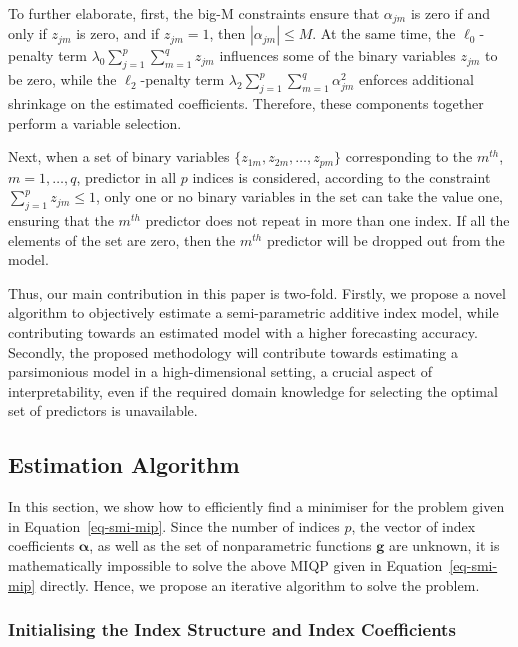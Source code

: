\documentclass[
  11pt,
  a4paper,
]{article}
\begin{document}
To further elaborate, first, the big-M constraints ensure that
\(\alpha_{jm}\) is zero if and only if \(z_{jm}\) is zero, and if
\(z_{jm} = 1\), then \(\left |\alpha_{jm}\right | \le M\). At the same
time, the \(\ell_{0}\)-penalty term
\(\lambda_{0}\sum_{j = 1}^{p}\sum_{m = 1}^{q}z_{jm}\) influences some of
the binary variables \(z_{jm}\) to be zero, while the
\(\ell_{2}\)-penalty term
\(\lambda_{2}\sum_{j = 1}^{p}\sum_{m = 1}^{q}\alpha_{jm}^{2}\) enforces
additional shrinkage on the estimated coefficients. Therefore, these
components together perform a variable selection.

Next, when a set of binary variables
\(\{z_{1m}, z_{2m}, \dots, z_{pm}\}\) corresponding to the \(m^{th}\),
\(m = 1, \dots, q\), predictor in all \(p\) indices is considered,
according to the constraint \(\sum_{j = 1}^{p}z_{jm} \le 1\), only one
or no binary variables in the set can take the value one, ensuring that
the \(m^{th}\) predictor does not repeat in more than one index. If all
the elements of the set are zero, then the \(m^{th}\) predictor will be
dropped out from the model.

Thus, our main contribution in this paper is two-fold. Firstly, we
propose a novel algorithm to objectively estimate a semi-parametric
additive index model, while contributing towards an estimated model with
a higher forecasting accuracy. Secondly, the proposed methodology will
contribute towards estimating a parsimonious model in a high-dimensional
setting, a crucial aspect of interpretability, even if the required
domain knowledge for selecting the optimal set of predictors is
unavailable.

\subsection{Estimation Algorithm}\label{estimation-algorithm}

In this section, we show how to efficiently find a minimiser for the
problem given in Equation~\ref{eq-smi-mip}. Since the number of indices
\(p\), the vector of index coefficients \(\bm{\alpha}\), as well as the
set of nonparametric functions \(\bm{g}\) are unknown, it is
mathematically impossible to solve the above MIQP given in
Equation~\ref{eq-smi-mip} directly. Hence, we propose an iterative
algorithm to solve the problem.

\subsubsection{Initialising the Index Structure and Index
Coefficients}\label{sec-step1}
\end{document}
